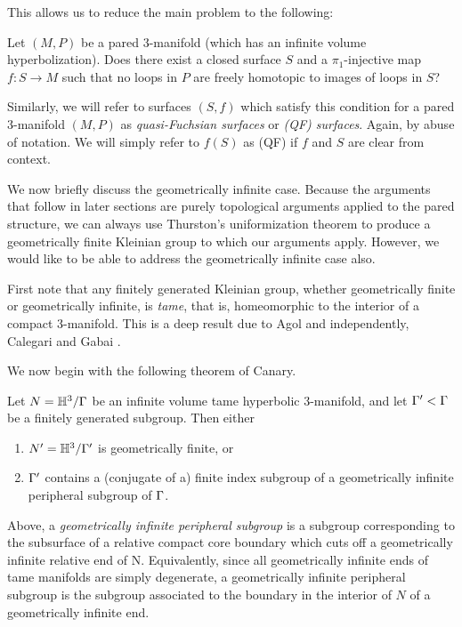 This allows us to reduce the main problem to the following:

\begin{prob}

Let $(M,P)$ be a pared $3$-manifold (which has an infinite volume
hyperbolization).  Does there exist a closed surface $S$ and
a $\pi_1$-injective map $f \colon S \to M$ such that no loops in $P$ are freely
homotopic to images of loops in $S$?

\end{prob}

Similarly, we will refer to surfaces $(S,f)$ which satisfy this condition for
a pared $3$-manifold $(M,P)$ as \emph{quasi-Fuchsian surfaces} or \emph{(QF)
surfaces}.  Again, by abuse of notation. We will simply refer to $f(S)$ as (QF)
if $f$ and $S$ are clear from context.

We now briefly discuss the geometrically infinite case. Because the arguments
that follow in later sections are purely topological arguments applied to the
pared structure, we can always use Thurston's uniformization theorem to produce
a geometrically finite Kleinian group to which our arguments apply. However, we
would like to be able to address the geometrically infinite case also.

First note that any finitely generated Kleinian group, whether geometrically
finite or geometrically infinite, is \emph{tame}, that is, homeomorphic to the
interior of a compact $3$-manifold. This is a deep result due to Agol
\cite{Agoltameness} and independently, Calegari and Gabai \cite{CalegariGabai}.

We now begin with the following theorem of Canary.

\begin{thm}

Let $N = \mathbb{H}^3/\Gamma$ be an infinite volume tame hyperbolic $3$-manifold, and let
$\Gamma' < \Gamma$ be a finitely generated subgroup. Then either

\begin{enumerate}

\item $N' = \mathbb{H}^3 / \Gamma'$ is geometrically finite, or

\item $\Gamma'$ contains a (conjugate of a) finite index subgroup of
a geometrically infinite peripheral subgroup of $\Gamma$.

\end{enumerate}

Above, a \emph{geometrically infinite peripheral subgroup} is a subgroup
corresponding to the subsurface of a relative compact core boundary which cuts
off a geometrically infinite relative end of N. Equivalently, since all
geometrically infinite ends of tame manifolds are simply degenerate,
a geometrically infinite peripheral subgroup is the subgroup associated to the
boundary in the interior of $N$ of a geometrically infinite end.

\end{thm}

